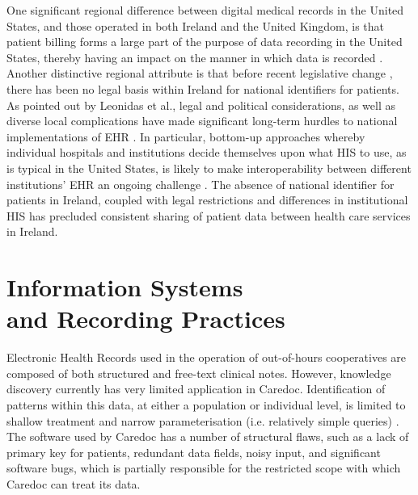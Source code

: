 One significant regional difference between digital medical records in the United States, and those operated in both Ireland and the United Kingdom, is that patient billing forms a large part of the purpose of data recording in the United States, thereby having an impact on the manner in which data is recorded \cite{alpert2019electronic}. Another distinctive regional attribute is that before recent legislative change \cite{kelleher2015privacy}, there has been no legal basis within Ireland for national identifiers for patients. As pointed out by Leonidas et al., legal and political considerations, as well as diverse local complications have made significant long-term hurdles to national implementations of EHR \cite{fragidis2018implementation}. In particular, bottom-up approaches whereby individual hospitals and institutions decide themselves upon what HIS to use, as is typical in the United States, is likely to make interoperability between different institutions' EHR an ongoing challenge \cite{fragidis2018implementation}. The absence of national identifier for patients in Ireland, coupled with legal restrictions and differences in institutional HIS has precluded consistent sharing of patient data between health care services in Ireland. 





\section{Information Systems \\ and Recording Practices}

Electronic Health Records used in the operation of out-of-hours cooperatives are composed of both structured and free-text clinical notes. However, knowledge discovery currently has very limited application in Caredoc. Identification of patterns within this data, at either a population or individual level, is limited to shallow treatment and narrow parameterisation (i.e. relatively simple queries) \cite{cunniffe2016developing,adastra}. The software used by Caredoc  has a number of structural flaws, such as a lack of primary key for patients, redundant data fields, noisy input, and significant software bugs, which is partially responsible for the restricted scope with which Caredoc can treat its data. 

